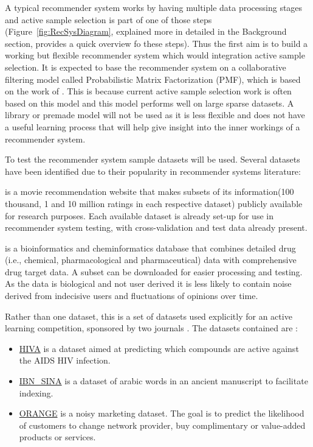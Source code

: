 A typical recommender system works by having multiple data processing stages and active sample selection is part of one of those steps (Figure~\ref*{fig:RecSysDiagram}, explained more in detailed in the Background section, provides a quick overview fo these steps). Thus the first aim is to build a working but flexible recommender system which would integration active sample selection. It is expected to base the recommender system on a collaborative filtering model called Probabilistic Matrix Factorization (PMF), which is based on the work of \cite{pmf}. This is because current active sample selection work is often based on this model and this model performs well on large sparse datasets. A library or premade model will not be used as it is less flexible and does not have a useful learning process that will help give insight into the inner workings of a recommender system.

To test the recommender system sample datasets will be used. Several datasets have been identified due to their popularity in recommender systems literature:
\begin{description}[style=standard,leftmargin=.7cm,font=\bfseries]
  \item[MovieLens] is a movie recommendation website that makes subsets of its information(100 thousand, 1 and 10 million ratings in each respective dataset) publicly available for research purposes. Each available dataset is already set-up for use in recommender system testing, with cross-validation and test data already present.
  \item[DrugBank] is a bioinformatics and cheminformatics database that combines detailed drug (i.e., chemical, pharmacological and pharmaceutical) data with comprehensive drug target data. A subset can be downloaded for easier processing and testing. As the data is biological and not user derived it is less likely to contain noise derived from indecisive users and fluctuations of opinions over time.
  \item[Active Learning Challenge] Rather than one dataset, this is a set of datasets used explicitly for an active learning competition, sponsored by two journals \cite{al-chall}. The datasets contained are :
  \begin{itemize}
  \item \underline{HIVA} is a dataset aimed at predicting which compounds are active against the AIDS HIV infection.
  \item \underline{IBN\_SINA} is a dataset of arabic words in an ancient manuscript to facilitate indexing.
  \item \underline{ORANGE} is a noisy marketing dataset. The goal is to predict the likelihood of customers to change network provider, buy complimentary or value-added products or services. 
  \end{itemize}
\end{description}


